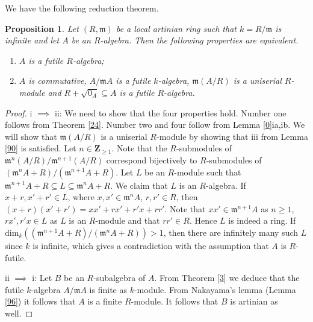 \documentclass{amsart}
\theoremstyle{plain}
\newtheorem{proposition}[theorem]{Proposition}
\theoremstyle{definition}
\begin{document}
We have the following reduction theorem.

\begin{proposition} \label{105}
Let $(R,{\mathfrak{m}})$ be a local artinian ring such that $k=R/{\mathfrak{m}}$ is infinite and let $A$ be an $R$-algebra. Then the following properties are
equivalent.
\begin{enumerate}
 \item $A$ is a futile $R$-algebra;
 \item $A$ is commutative, $A/{\mathfrak{m}} A$ is a futile $k$-algebra, ${\mathfrak{m}} (A/R)$ is a uniserial $R$-module and $R+\sqrt{0_A} \subseteq A$ is a futile $R$-algebra.
\end{enumerate}
\end{proposition}
\begin{proof}
 i $\implies$ ii: We need to show that the four properties hold. Number one follows from Theorem \ref{24}. Number two and four follow from Lemma
\ref{0}ia,ib. We will show that ${\mathfrak{m}}( A/R)$ is a uniserial $R$-module by showing that iii from Lemma \ref{90} is satisfied. Let $n \in {\mathbf{Z}}_{\geq 1}$.
Note that the $R$-submodules of ${\mathfrak{m}}^n
(A/R) /{\mathfrak{m}}^{n+1} (A/R)$ correspond bijectively to $R$-submodules of $\left({\mathfrak{m}}^n A +R \right) / \left({\mathfrak{m}}^{n+1} A +R \right)$. Let $L$ be an $R$-module such that ${\mathfrak{m}}^{n+1}A+R \subseteq L \subseteq {\mathfrak{m}}^n A+R$. We claim that $L$ is an $R$-algebra. If $x+r, x'+r' \in L$, where
$x,x' \in {\mathfrak{m}}^n A$, $r,r' \in R$, then $(x+r)(x'+r')=xx'+rx'+r'x+rr'$. Note that $xx' \in {\mathfrak{m}}^{n+1}A$ as $n \geq 1$, $rx', r'x \in L$ as $L$ is an
$R$-module and that $rr' \in R$. Hence $L$ is indeed a ring. If $\mathrm{dim}_k( \left({\mathfrak{m}}^{n+1}A+R\right)/ \left({\mathfrak{m}}^n A +R \right)) >1$, then there
are infinitely many such $L$ since $k$ is infinite, which gives a contradiction with the assumption that $A$ is $R$-futile. 

 ii $\implies$ i: Let $B$ be an $R$-subalgebra of $A$. From Theorem \ref{3} we deduce that the futile $k$-algebra $A/{\mathfrak{m}} A$ is finite as $k$-module.
From Nakayama's lemma (Lemma \ref{96}) it follows
that $A$ is a finite $R$-module. It follows that $B$ is artinian as well. 


\end{proof}
\end{document}
